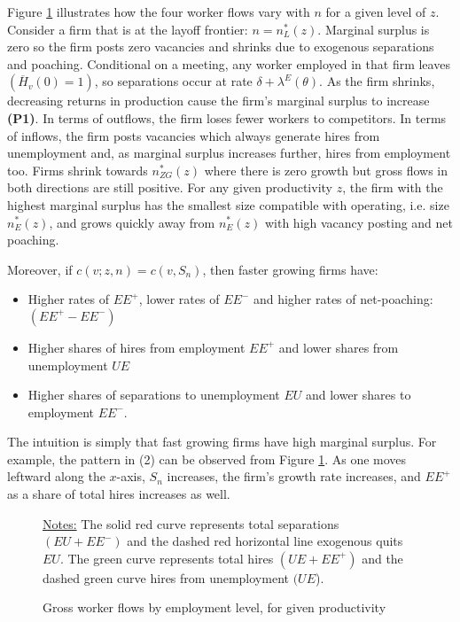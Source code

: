 Figure \ref{fig:GrossFlows} illustrates how the four worker flows vary with $n$ for a given level of $z$.
Consider a firm that is at the layoff frontier: $n=n^\ast_L(z)$.
Marginal surplus is zero so the firm posts zero vacancies and shrinks due to exogenous separations and poaching.
Conditional on a meeting, any worker employed in that firm leaves $(\overline{H}_v(0)=1)$, so separations occur at rate $\delta+\lambda^E(\theta)$.
As the firm shrinks, decreasing returns in production cause the firm's marginal surplus to increase \textbf{(P1)}.
In terms of outflows, the firm loses fewer workers to competitors.
In terms of inflows, the firm posts vacancies which always generate hires from unemployment and, as marginal surplus increases further, hires from employment too.
Firms shrink towards $n^\ast_{ZG}(z)$ where there is zero growth but gross flows in both directions are still positive.
For any given productivity $z$, the firm with the highest marginal surplus has the smallest size compatible with operating, i.e. size $n_{E}^\ast(z)$, and grows quickly away from $n_{E}^\ast(z)$ with high vacancy posting and net poaching.

Moreover, if $c(v;z,n)=c(v,S_n)$, then faster growing firms have:\vspace*{-.3cm}
\begin{itemize}
\item[(1)] Higher rates of $EE^{+}$, lower rates of $EE^{-}$ and higher rates of net-poaching: $(EE^{+}-EE^{-})$\vspace*{-.3cm}
\item[(2)] Higher shares of hires from employment $EE^{+}$ and lower shares from unemployment $UE$\vspace*{-.3cm}
\item[(3)] Higher shares of separations to unemployment $EU$ and lower shares to employment $EE^{-}$.
\end{itemize}
The intuition is simply that fast growing firms have high marginal surplus.
For example, the pattern in (2) can be observed from Figure \ref{fig:GrossFlows}.
As one moves leftward along the $x$-axis, $S_n$ increases, the firm's growth rate increases, and $EE^{+}$ as a share of total hires increases as well.

\begin{figure}[ttt]
\begin{center}
\hspace*{-3.5cm} \scalebox{0.90}{}
\caption{Gross worker flows by employment level, for given productivity}\label{fig:GrossFlows}\vspace*{-.3cm}
\end{center}
{\footnotesize {\underline{Notes:} The solid red curve represents total
separations $(EU+EE^{-})$ and the dashed red horizontal line exogenous quits
$EU$. The green curve represents total hires $(UE+EE^{+})$ and the dashed
green curve hires from unemployment $(UE$).} }
\end{figure}


